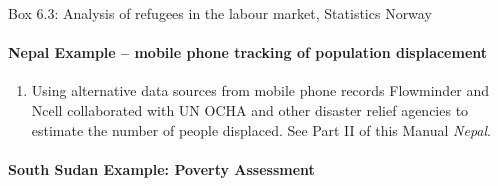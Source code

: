 \documentclass[
]{article}
\providecommand{\tightlist}{%
  \setlength{\itemsep}{0pt}\setlength{\parskip}{0pt}}
\begin{document}
Box 6.3: Analysis of refugees in the labour market, Statistics Norway

\hypertarget{nepal-example-mobile-phone-tracking-of-population-displacement}{%
\paragraph{Nepal Example -- mobile phone tracking of population displacement}\label{nepal-example-mobile-phone-tracking-of-population-displacement}}

\begin{enumerate}
\def\labelenumi{\arabic{enumi}.}
\setcounter{enumi}{450}
\tightlist
\item
  Using alternative data sources from mobile phone records Flowminder
  and Ncell collaborated with UN OCHA and other disaster relief
  agencies to estimate the number of people displaced. See Part II of
  this Manual \emph{Nepal}.
\end{enumerate}

\hypertarget{south-sudan-example-poverty-assessment}{%
\paragraph{South Sudan Example: Poverty Assessment}\label{south-sudan-example-poverty-assessment}}
\end{document}

